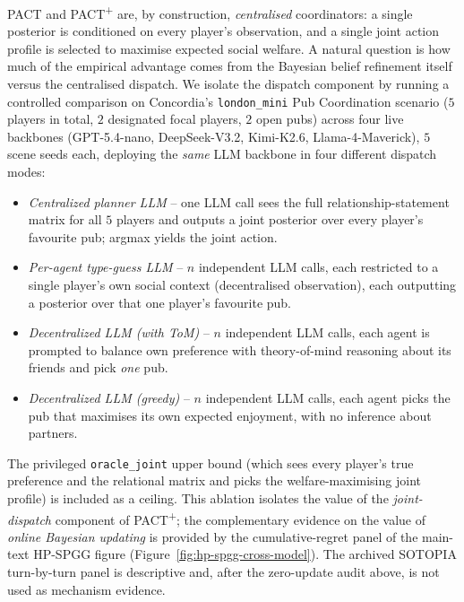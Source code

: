 PACT and PACT\textsuperscript{+} are, by construction, \emph{centralised} coordinators: a single posterior is conditioned on every player's observation, and a single joint action profile is selected to maximise expected social welfare. A natural question is how much of the empirical advantage comes from the Bayesian belief refinement itself versus the centralised dispatch. We isolate the dispatch component by running a controlled comparison on Concordia's \texttt{london\_mini} Pub Coordination scenario ($5$ players in total, $2$ designated focal players, $2$ open pubs) across four live backbones (GPT-5.4-nano, DeepSeek-V3.2, Kimi-K2.6, Llama-4-Maverick), $5$ scene seeds each, deploying the \emph{same} LLM backbone in four different dispatch modes:
\begin{itemize}\itemsep -1pt \topsep -2pt
  \item \emph{Centralized planner LLM} -- one LLM call sees the full relationship-statement matrix for all $5$ players and outputs a joint posterior over every player's favourite pub; argmax yields the joint action.
  \item \emph{Per-agent type-guess LLM} -- $n$ independent LLM calls, each restricted to a single player's own social context (decentralised observation), each outputting a posterior over that one player's favourite pub.
  \item \emph{Decentralized LLM (with ToM)} -- $n$ independent LLM calls, each agent is prompted to balance own preference with theory-of-mind reasoning about its friends and pick \emph{one} pub.
  \item \emph{Decentralized LLM (greedy)} -- $n$ independent LLM calls, each agent picks the pub that maximises its own expected enjoyment, with no inference about partners.
\end{itemize}
The privileged \texttt{oracle\_joint} upper bound (which sees every player's true preference and the relational matrix and picks the welfare-maximising joint profile) is included as a ceiling. This ablation isolates the value of the \emph{joint-dispatch} component of PACT\textsuperscript{+}; the complementary evidence on the value of \emph{online Bayesian updating} is provided by the cumulative-regret panel of the main-text HP-SPGG figure (Figure~\ref{fig:hp-spgg-cross-model}). The archived SOTOPIA turn-by-turn panel is descriptive and, after the zero-update audit above, is not used as mechanism evidence.

